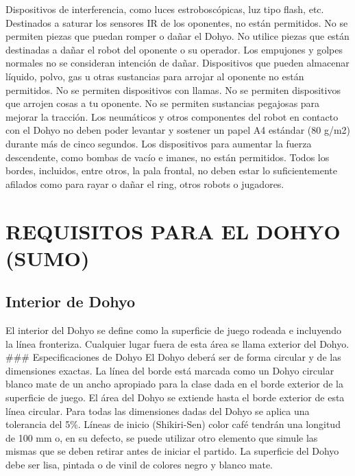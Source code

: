 \documentclass[
  letterpaper,
  DIV=11,
  numbers=noendperiod]{scrreprt}
\begin{document}
Dispositivos de interferencia, como luces estroboscópicas, luz tipo
flash, etc. Destinados a saturar los sensores IR de los oponentes, no
están permitidos. No se permiten piezas que puedan romper o dañar el
Dohyo. No utilice piezas que están destinadas a dañar el robot del
oponente o su operador. Los empujones y golpes normales no se consideran
intención de dañar. Dispositivos que pueden almacenar líquido, polvo,
gas u otras sustancias para arrojar al oponente no están permitidos. No
se permiten dispositivos con llamas. No se permiten dispositivos que
arrojen cosas a tu oponente. No se permiten sustancias pegajosas para
mejorar la tracción. Los neumáticos y otros componentes del robot en
contacto con el Dohyo no deben poder levantar y sostener un papel A4
estándar (80 g/m2) durante más de cinco segundos. Los dispositivos para
aumentar la fuerza descendente, como bombas de vacío e imanes, no están
permitidos. Todos los bordes, incluidos, entre otros, la pala frontal,
no deben estar lo suficientemente afilados como para rayar o dañar el
ring, otros robots o jugadores.

\section{REQUISITOS PARA EL DOHYO
(SUMO)}\label{requisitos-para-el-dohyo-sumo}

\subsection{Interior de Dohyo}\label{interior-de-dohyo}

El interior del Dohyo se define como la superficie de juego rodeada e
incluyendo la línea fronteriza. Cualquier lugar fuera de esta área se
llama exterior del Dohyo. \#\#\# Especificaciones de Dohyo El Dohyo
deberá ser de forma circular y de las dimensiones exactas. La línea del
borde está marcada como un Dohyo circular blanco mate de un ancho
apropiado para la clase dada en el borde exterior de la superficie de
juego. El área del Dohyo se extiende hasta el borde exterior de esta
línea circular. Para todas las dimensiones dadas del Dohyo se aplica una
tolerancia del 5\%. Líneas de inicio (Shikiri-Sen) color café tendrán
una longitud de 100 mm o, en su defecto, se puede utilizar otro elemento
que simule las mismas que se deben retirar antes de iniciar el partido.
La superficie del Dohyo debe ser lisa, pintada o de vinil de colores
negro y blanco mate.
\end{document}
